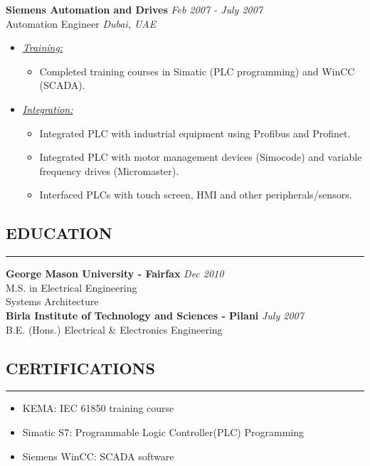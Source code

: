 \documentclass{article}
\begin{document}
    {\bf Siemens Automation and Drives} \hfill {\em Feb 2007 - July 2007} \\
    Automation Engineer \hfill {\em Dubai, UAE} \\
    \begin{itemize}
    \item \underline{\it Training:}
          \begin{itemize}
          \item Completed training courses in Simatic (PLC programming) and
                WinCC (SCADA).
          \end{itemize}
    \item \underline{\it Integration:}
          \begin{itemize}
          \item Integrated PLC with industrial equipment using Profibus and
                Profinet.
          \item Integrated PLC with motor management devices (Simocode) and
                variable frequency drives (Micromaster).
          \item Interfaced PLCs with touch screen, HMI and other
                peripherals/sensors.
          \end{itemize}
    \end{itemize}
    \bigskip

%
\subsection*{\MakeUppercase{\bf Education}}
    \hrule
    \bigskip
    {\bf George Mason University - Fairfax} \hfill {\em Dec 2010} \\ 
    M.S. in Electrical Engineering \\
    Systems Architecture \bigskip \\

    {\bf Birla Institute of Technology and Sciences - Pilani}
    \hfill {\em July 2007} \\ 
    B.E. (Hons.) Electrical \& Electronics Engineering \bigskip \\

%
\subsection*{\MakeUppercase{\bf Certifications}}
    \hrule
    \bigskip
    \begin{itemize}
    \item KEMA: IEC 61850 training course
    \item Simatic S7: Programmable Logic Controller(PLC) Programming
    \item Siemens WinCC: SCADA software
    \end{itemize}
    \bigskip
\end{document}
